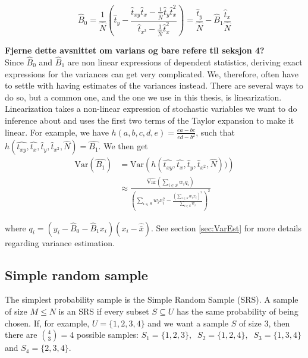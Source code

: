 \documentclass{article}
\begin{document}
\begin{equation*}
 \hat{B}_0 = \frac{1}{\widehat{N}} \left( \hat{t}_y - \frac{\hat{t}_{xy} \hat{t}_x - \frac{1}{\widehat{N}} \hat{t}_y \hat{t}_x^2}
   {\hat{t}_{x^2} - \frac{1}{\widehat{N}} \hat{t}_x^2}
 \right)
 = \frac{\hat{t}_y}{\hat{N}} - \hat{B}_1\frac{\hat{t}_x}{\hat{N}}
\end{equation*}

\textbf{Fjerne dette avsnittet om varians og bare refere til seksjon 4?}\\
Since \(\hat{B}_0\) and \(\hat{B}_1\) are non linear expressions of dependent
statistics, deriving exact expressions for the variances can get very complicated. We, therefore,
often have to settle with having estimates of the variances instead.
There are several ways to do so, but a common one,
and the one we use in this thesis, is linearization. Linearization takes a
non-linear expression of stochastic variables we want to do inference about and uses
the first two terms of the Taylor expansion to make it linear.
For example, we have \(h(a, b, c, d, e) = \frac{ea - bc}{ed - b^2}\), such that
\(h(\hat{t_{xy}}, \hat{t_x}, \hat{t}_y, \hat{t}_{x^2}, \hat{N}) = \hat{B_1}\).
We then get
\begin{align*}
 \mathrm{Var}(\hat{B_1})
 &= \mathrm{Var} \left( h(\hat{t_{xy}}, \hat{t_x},
 \hat{t}_y, \hat{t}_{x^2}, \hat{N})) \right) \\
 &\approx \frac{\widehat{\mathrm{Var}}\left( \sum_{i \in S} w_i q_i \right)}
   {\left( \sum_{i \in S} w_i x_i^2 - \frac{\left( \sum_{i \in S} w_i x_i \right)^2}{\sum_{i \in S} w_i} \right)^2}
\end{align*}

where \(q_i = (y_i - \hat{B}_0 - \hat{B}_1 x_i)(x_i - \hat{\bar{x}})\). See
section \ref{sec:VarEst} for more details regarding variance estimation.

\subsection{Simple random sample} \label{sec:SRS}

The simplest probability sample is the Simple Random Sample (SRS). A
sample of size \(M \leq N\) is an SRS if every subset \(S \subseteq U\) has the same
probability of being chosen.
If, for example, \(U = \{1, 2, 3, 4\}\) and we want a sample \(S\) of
size \(3\), then there are \(\binom{4}{3} = 4\)  possible samples:
\( S_1 = \{1, 2, 3\},\ \)
\( S_2 = \{1, 2, 4\},\ \)
\( S_3 = \{1, 3, 4\}\ \) and
\( S_4 = \{2, 3, 4\} \).
\end{document}
